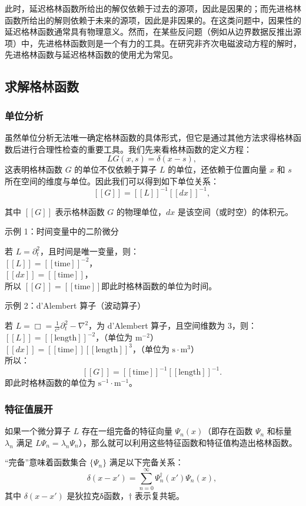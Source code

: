 此时，延迟格林函数所给出的解仅依赖于过去的源项，因此是因果的；而先进格林函数所给出的解则依赖于未来的源项，因此是非因果的。在这类问题中，因果性的延迟格林函数通常具有物理意义。然而，在某些反问题（例如从边界数据反推出源项）中，先进格林函数则是一个有力的工具。在研究非齐次电磁波动方程的解时，先进格林函数与延迟格林函数的使用尤为常见。
\subsection{求解格林函数}
\subsubsection{单位分析}
虽然单位分析无法唯一确定格林函数的具体形式，但它是通过其他方法求得格林函数后进行合理性检查的重要工具。我们先来看格林函数的定义方程：
$$
LG(x, s) = \delta(x - s),~
$$
这表明格林函数 $G$ 的单位不仅依赖于算子 $L$ 的单位，还依赖于位置向量 $x$ 和 $s$ 所在空间的维度与单位。因此我们可以得到如下单位关系：
$$
[[G]] = [[L]]^{-1} [[dx]]^{-1},~
$$

其中 $[[G]]$ 表示格林函数 $G$ 的物理单位，$dx$ 是该空间（或时空）的体积元。

示例 1：时间变量中的二阶微分

若 $L = \partial_t^2$，且时间是唯一变量，则：\\
$[[L]] = [[\text{time}]]^{-2}$，\\
$[[dx]] = [[\text{time}]]$，\\
所以 $[[G]] = [[\text{time}]]$即此时格林函数的单位为时间。

示例 2：d'Alembert 算子（波动算子）

若 $L = \Box = \frac{1}{c^2} \partial_t^2 - \nabla^2$，为 d'Alembert 算子，且空间维数为 3，则：\\
$[[L]] = [[\text{length}]]^{-2}$，（单位为 $\text{m}^{-2}$）\\
$[[dx]] = [[\text{time}]] [[\text{length}]]^3$，（单位为 $\text{s} \cdot \text{m}^3$）\\
所以：
$$
[[G]] = [[\text{time}]]^{-1} [[\text{length}]]^{-1}.~
$$
即此时格林函数的单位为 $\text{s}^{-1} \cdot \text{m}^{-1}$。
\subsubsection{特征值展开}
如果一个微分算子 $L$ 存在一组完备的特征向量 $\Psi_n(x)$（即存在函数 $\Psi_n$ 和标量 $\lambda_n$ 满足 $L \Psi_n = \lambda_n \Psi_n$），那么就可以利用这些特征函数和特征值构造出格林函数。

“完备”意味着函数集合 $\{\Psi_n\}$ 满足以下完备关系：
$$
\delta(x - x') = \sum_{n=0}^{\infty} \Psi_n^{\dagger}(x') \Psi_n(x),~
$$
其中 $\delta(x - x')$ 是狄拉克δ函数，$\dagger$ 表示复共轭。

